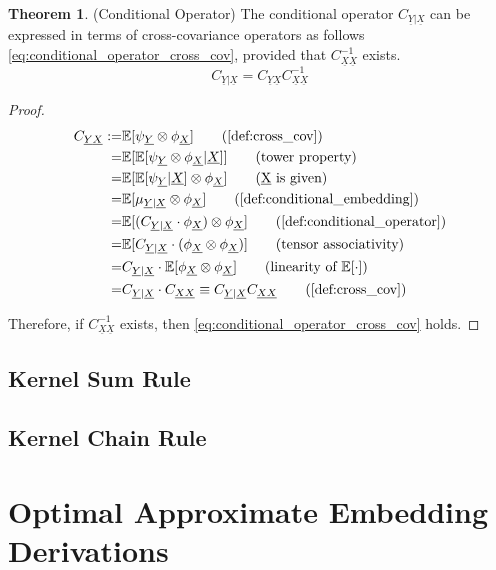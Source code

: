 \documentclass[twoside]{article} \usepackage{aistats2017}
\theoremstyle{definition}
\newtheorem{theorem}{Theorem}[section]
\newcommand{\rv}[1]{\underline{#1}}
\newcommand{\expect}[1]{{\mathbb{E}[#1]}}
\newcommand{\phiX}{\phi_{\rv{X}}}
\newcommand{\psiY}{\psi_{\rv{Y}}}
\newcommand{\Cyx}{C_{\rv{Y} \rv{X}}}
\newcommand{\Cxx}{C_{\rv{X} \rv{X}}}
\newcommand{\Cylx}{C_{\rv{Y} | \rv{X}}}
\begin{document}
	\begin{theorem} \label{thm:conditional_operator}
		(Conditional Operator)
		The conditional operator $\Cylx$ can be expressed in terms of cross-covariance operators as follows \eqref{eq:conditional_operator_cross_cov}, provided that $\Cxx^{-1}$ exists.
		\begin{equation}
			\Cylx = \Cyx \Cxx^{-1}
		\label{eq:conditional_operator_cross_cov}
		\end{equation}
		
		\begin{proof}
			\begin{align*}
			\Cyx :=& \expect{\psiY \otimes \phiX} \tag{\cref{def:cross_cov}}\\
			=& \expect{\expect{\psiY \otimes \phiX | \rv{X}}} \tag{tower property} \\
			=& \expect{\expect{\psiY| \rv{X}} \otimes \phiX} \tag{\rv{X} is given} \\
			=& \expect{\mu_{\rv{Y} | \rv{X}} \otimes \phiX} \tag{\cref{def:conditional_embedding}}\\
			=& \expect{(\Cylx \cdot \phiX) \otimes \phiX} \tag{\cref{def:conditional_operator}} \\
			=& \expect{\Cylx \cdot (\phiX \otimes \phiX)} \tag{tensor associativity} \\
			=& \Cylx \cdot \expect{\phiX \otimes \phiX} \tag{linearity of $\expect{\cdot}$} \\
			=& \Cylx \cdot \Cxx \equiv \Cylx \Cxx \tag{\cref{def:cross_cov}}
			\end{align*}
			
			Therefore, if $\Cxx^{-1}$ exists, then \eqref{eq:conditional_operator_cross_cov} holds.
		\end{proof}
	\end{theorem}
	
	\subsection{Kernel Sum Rule}
	
	\subsection{Kernel Chain Rule}
	
\section{Optimal Approximate Embedding Derivations}
\end{document}
